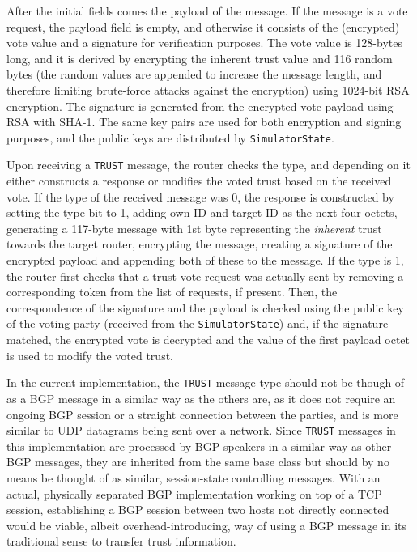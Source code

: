\documentclass[11pt,a4paper,titlepage]{report}
\begin{document}
After the initial fields comes the payload of the message. If the message is a vote request, the payload field is empty, and otherwise it consists of the (encrypted) vote value and a signature for verification purposes. The vote value is 128-bytes long, and it is derived by encrypting the inherent trust value and 116 random bytes (the random values are appended to increase the message length, and therefore limiting brute-force attacks against the encryption) using 1024-bit RSA encryption. The signature is generated from the encrypted vote payload using RSA with SHA-1. The same key pairs are used for both encryption and signing purposes, and the public keys are distributed by \texttt{SimulatorState}.

Upon receiving a \texttt{TRUST} message, the router checks the type, and depending on it either constructs a response or modifies the voted trust based on the received vote. If the type of the received message was 0, the response is constructed by setting the type bit to 1, adding own ID and target ID as the next four octets, generating a 117-byte message with 1st byte representing the \emph{inherent} trust towards the target router, encrypting the message, creating a signature of the encrypted payload and appending both of these to the message. If the type is 1, the router first checks that a trust vote request was actually sent by removing a corresponding token from the list of requests, if present. Then, the correspondence of the signature and the payload is checked using the public key of the voting party (received from the \texttt{SimulatorState}) and, if the signature matched, the encrypted vote is decrypted and the value of the first payload octet is used to modify the voted trust.

In the current implementation, the \texttt{TRUST} message type should not be though of as a BGP message in a similar way as the others are, as it does not require an ongoing BGP session or a straight connection between the parties, and is more similar to UDP datagrams being sent over a network. Since \texttt{TRUST} messages in this implementation are processed by BGP speakers in a similar way as other BGP messages, they are inherited from the same base class but should by no means be thought of as similar, session-state controlling messages. With an actual, physically separated BGP implementation working on top of a TCP session, establishing a BGP session between two hosts not directly connected would be viable, albeit overhead-introducing, way of using a BGP message in its traditional sense to transfer trust information.
\end{document}
